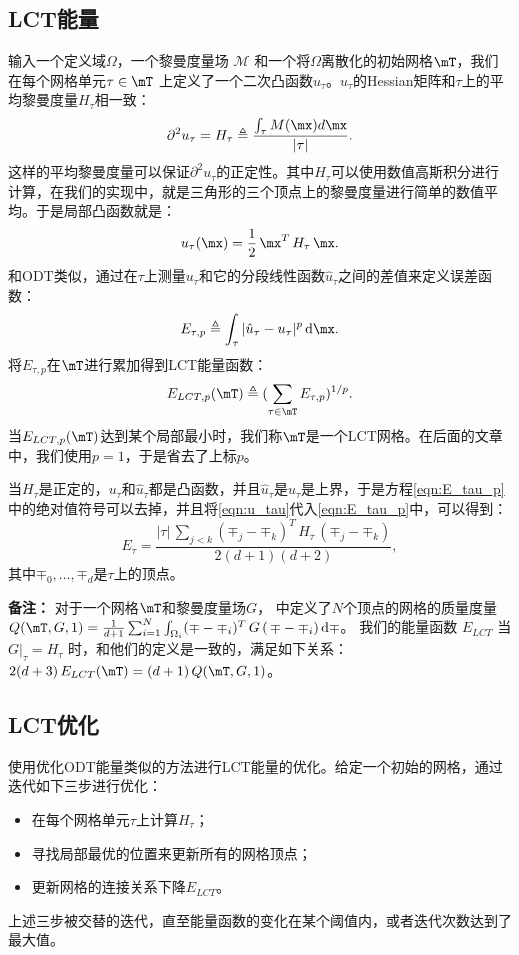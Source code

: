 \subsection{LCT能量}
输入一个定义域$\Omega$，一个黎曼度量场 $\mathcal{M}$ 和一个将$\Omega$离散化的初始网格$\mT$，我们在每个网格单元$\tau \in \mT$ 上定义了一个二次凸函数$u_{\tau}$。$u_{\tau}$的Hessian矩阵和$\tau$上的平均黎曼度量$H_{\tau}$相一致：
\begin{equation}
\partial^2 u_{\tau} = H_{\tau} \triangleq \frac{ \int_{\tau} M(\mx)d\mx }{|\tau|}.
\end{equation}
这样的平均黎曼度量可以保证$\partial^2 u_{\tau}$的正定性。其中$H_{\tau}$可以使用数值高斯积分进行计算，在我们的实现中，就是三角形的三个顶点上的黎曼度量进行简单的数值平均。于是局部凸函数就是：
\begin{equation}\label{eqn:u_tau}
	u_\tau (\mx) = \dfrac{1}{2} \, \mx^T \, H_\tau \,  \mx .
\end{equation}
和ODT类似，通过在$\tau$上测量$u_\tau$和它的分段线性函数$\hat{u}_{\tau}$之间的差值来定义误差函数：
\begin{equation}\label{eqn:E_tau_p}
	E_{\tau,p} \triangleq \int_\tau |\hat{u}_\tau - u_\tau|^p \, \mathrm{d} \mx.
\end{equation}
将$E_{\tau,p}$在$\mT$进行累加得到LCT能量函数：
\begin{equation}
E_{LCT,p}(\mT) \triangleq (\sum_{\tau \in \mT}E_{\tau,p})^{1/p}.
\end{equation}
当$E_{LCT,p}(\mT)$达到某个局部最小时，我们称$\mT$是一个LCT网格。在后面的文章中，我们使用$p=1$，于是省去了上标$p$。

当$H_{\tau}$是正定的，$u_\tau$和$\hat{u}_\tau$都是凸函数，并且$\hat{u}_\tau$是$u_\tau$是上界，于是方程\ref{eqn:E_tau_p} 中的绝对值符号可以去掉，并且将\ref{eqn:u_tau}代入\ref{eqn:E_tau_p}中，可以得到：
\begin{equation}\label{eqn:simplexenergy}
E_\tau = \frac{|\tau| \, \sum_{j < k}(\mp_j-\mp_k)^T \, H_\tau \, (\mp_j-\mp_k)}{2(d+1)(d+2)},
\end{equation}
其中$\mp_0,\ldots,\mp_d$是$\tau$上的顶点。

\textbf{备注：} 对于一个网格$\mT$和黎曼度量场$G$， \cite{Chen2004a}中定义了$N$个顶点的网格的质量度量$Q(\mT, G, 1) = \frac{1}{d+1} \sum_{i=1}^N \int_{\Omega_i} (\mp-\mp_i)^T \, G \, (\, \mp-\mp_i)\, \mathrm{d} \mp$。 我们的能量函数 $E_{LCT}$ 当$G|_\tau = H_\tau$ 时，和他们的定义是一致的，满足如下关系：$2(d+3) \, E_{LCT}(\mT) = (d+1) \, Q(\mT, G, 1)$。

\subsection{LCT优化}
使用优化ODT能量类似的方法进行LCT能量的优化。给定一个初始的网格，通过迭代如下三步进行优化：
\begin{itemize}
    \item 在每个网格单元$\tau$上计算$H_\tau$；
    \item 寻找局部最优的位置来更新所有的网格顶点；
    \item 更新网格的连接关系下降$E_{LCT}$。
\end{itemize}
上述三步被交替的迭代，直至能量函数的变化在某个阈值内，或者迭代次数达到了最大值。

